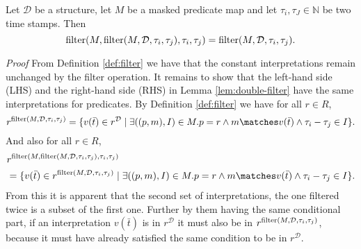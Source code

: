 \begin{lemma}
    \label{lem:double-filter}
    Let $\mathcal{D}$ be a structure, let $M$ be a masked predicate map and let $\tau_i, \tau_J \in \mathbb{N}$ be two time stamps.
    Then 
    \begin{equation*}
        \operatorname{filter}(M, \operatorname{filter}(M, \mathcal{D}, \tau_i, \tau_j), \tau_i, \tau_j) = \operatorname{filter}(M, \mathcal{D}, \tau_i, \tau_j).
    \end{equation*}
\end{lemma}
\textit{Proof} From Definition \ref{def:filter} we have that the constant interpretations remain unchanged by the filter operation.
It remains to show that the left-hand side (LHS) and the right-hand side (RHS) in Lemma \ref{lem:double-filter} have the same interpretations for predicates.
By Definition \ref{def:filter} we have 
for all $r \in R$,
\begin{equation*}
    r^{\filter(M, \mathcal{D}, \tau_i, \tau_j)} 
    = \{v(\bar{t}) \in r^{\mathcal{D}} \mid 
        \exists ((p,m), I) \in M. 
            p = r 
            \land m \matches v(\bar{t}) 
            \land \tau_i - \tau_j \in I \}.
\end{equation*}
And also for all $r \in R$,
\begin{align*}
    &r^{\filter(M, \filter(M, \mathcal{D}, \tau_i, \tau_j), \tau_i, \tau_j)} \\
    &= \{v(\bar{t}) \in r^{\filter(M, \mathcal{D}, \tau_i, \tau_j)} \mid 
        \exists ((p,m), I) \in M. 
            p = r 
            \land m \matches v(\bar{t}) 
            \land \tau_i - \tau_j \in I \}.
\end{align*}
From this it is apparent that the second set of interpretations, the one filtered twice is a subset of the first one.
Further by them having the same conditional part, if an interpretation $v(\bar{t})$ is in $r^{\mathcal{D}}$ it must also be in $r^{\operatorname{filter}(M, \mathcal{D}, \tau_i, \tau_j)}$, because it must have already satisfied the same condition to be in $r^{\mathcal{D}}$.